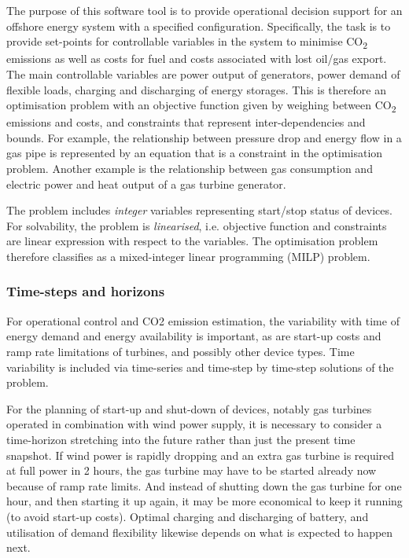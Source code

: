 \documentclass[12pt]{article}
\begin{document}
The purpose of this software tool is to provide operational decision support for an offshore energy system with a specified configuration.  Specifically, the task is to provide set-points for controllable variables in the system to minimise CO\textsubscript{2} emissions as well as costs for fuel and costs associated with lost oil/gas export. 
The main controllable variables are power output of generators, power demand of flexible loads, charging and discharging of energy storages. This is therefore an optimisation problem with an objective function given by weighing between CO\textsubscript{2} emissions and costs, and constraints that represent inter-dependencies and bounds. For example, the relationship between pressure drop and energy flow in a gas pipe is represented by an equation that is a constraint in the optimisation problem. Another example is the relationship between gas consumption and electric power and heat output of a gas turbine generator.

The problem includes \emph{integer} variables representing start/stop status of devices. For solvability, the problem is \emph{linearised}, i.e. objective function and constraints are linear expression with respect to the variables. The optimisation problem therefore classifies as a mixed-integer linear programming (MILP) problem.


\subsubsection{Time-steps and horizons}

For operational control and CO2 emission estimation, the variability with time of energy demand and energy availability is important, as are start-up costs and ramp rate limitations of turbines, and possibly other device types. Time variability is included via time-series and time-step by time-step solutions of the problem.

For the planning of start-up and shut-down of devices, notably gas turbines operated in combination with wind power supply, it is necessary to consider a time-horizon stretching into the future rather than just the present time snapshot. If wind power is rapidly dropping and an extra gas turbine is required at full power in 2 hours, the gas turbine may have to be started already now because of ramp rate limits. And instead of shutting down the gas turbine for one hour, and then starting it up again, it may be more economical to keep it running (to avoid start-up costs). Optimal charging and discharging of battery, and utilisation of demand flexibility likewise depends on what is expected to happen next.
\end{document}
